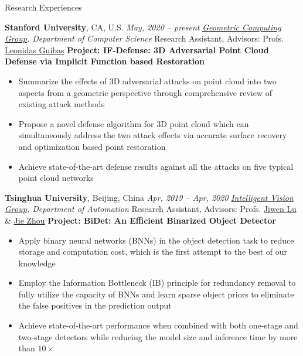 \documentclass{resume} %
\begin{document}
\begin{rSection}{Research Experiences}

{\textbf{Stanford University}, CA, U.S.} \hfill {\em May, 2020 -- present}\newline
\emph{\href{https://geometry.stanford.edu/}{Geometric Computing Group}, Department of Computer Science}\newline
Research Assistant, Advisors: Profs. \href{https://geometry.stanford.edu/member/guibas/index.html}{Leonidas Guibas}\newline
\textbf{Project: IF-Defense: 3D Adversarial Point Cloud Defense via Implicit Function based Restoration}
\begin{itemize}
    \item Summarize the effects of 3D adversarial attacks on point cloud into two aspects from a geometric perspective through comprehensive review of existing attack methods
    \item Propose a novel defense algorithm for 3D point cloud which can simultaneously address the two attack effects via accurate surface recovery and optimization based point restoration
    \item Achieve state-of-the-art defense results against all the attacks on five typical point cloud networks\newline
\end{itemize}

{\textbf{Tsinghua University}, Beijing, China} \hfill {\em Apr, 2019 -- Apr, 2020}\newline
\emph{\href{http://ivg.au.tsinghua.edu.cn/index.php}{Intelligent Vision Group}, Department of Automation}\newline
Research Assistant, Advisors: Profs. \href{http://ivg.au.tsinghua.edu.cn/Jiwen_Lu/}{Jiwen Lu} \& \href{https://www.tsinghua.edu.cn/publish/auen/1713/2011/20110506105532098625469/20110506105532098625469_.html}{Jie Zhou}\newline
\textbf{Project: BiDet: An Efficient Binarized Object Detector}
\begin{itemize}
    \item Apply binary neural networks (BNNs) in the object detection task to reduce storage and computation cost, which is the first attempt to the best of our knowledge
    \item Employ the Information Bottleneck (IB) principle for redundancy removal to fully utilize the capacity of BNNs and learn sparse object priors to eliminate the false positives in the prediction output
    \item Achieve state-of-the-art performance when combined with both one-stage and two-stage detectors while reducing the model size and inference time by more than $10\times$\newline
\end{itemize}


\end{rSection}
\end{document}

